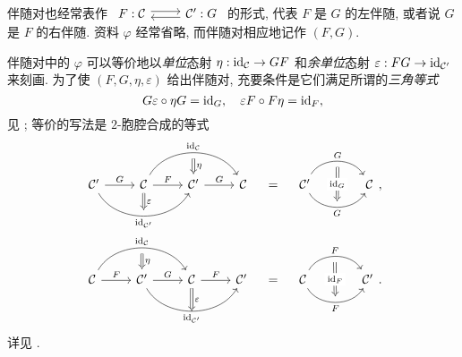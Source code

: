 伴随对也经常表作
$\begin{tikzcd}
	F: \mathcal{C} \arrow[shift left, r] & \mathcal{C}' \arrow[l, shift left] : G
\end{tikzcd}$
的形式, 代表 $F$ 是 $G$ 的左伴随, 或者说 $G$ 是 $F$ 的右伴随. 资料 $\varphi$ 经常省略, 而伴随对相应地记作 $(F, G)$.

伴随对中的 $\varphi$ 可以等价地以\emph{单位}态射 $\eta: \mathrm{id}_{\mathcal{C}} \to GF$ 和\emph{余单位}态射 $\varepsilon: FG \to \mathrm{id}_{\mathcal{C}'}$ 来刻画. 为了使 $(F, G, \eta, \varepsilon)$ 给出伴随对, 充要条件是它们满足所谓的\emph{三角等式}
\[ G\varepsilon \circ \eta G = \mathrm{id}_G, \quad \varepsilon F \circ F\eta = \mathrm{id}_F, \]
见 \cite[(2.6) + 命题 2.6.5]{Li1}; 等价的写法是 $2$-胞腔合成的等式
\begin{equation*}\begin{gathered}
	\begin{tikzcd}
		\mathcal{C}' \arrow[r, "G"] \arrow[rr, bend right=60, "\identity_{\mathcal{C}'}"', "" {name=B}] & \mathcal{C} \arrow[r, "F"] \arrow[Rightarrow, to=B, "\varepsilon"] \arrow[rr, bend left=60, "\identity_{\mathcal{C}}", ""' {name=T}] & \mathcal{C}' \arrow[r, "G"] \arrow[Rightarrow, from=T, "\eta"] & \mathcal{C}
	\end{tikzcd} \quad = \quad \begin{tikzcd}[column sep=large]
		\mathcal{C}' \arrow[r, bend left=60, "G", ""' {name=T}] \arrow[r, bend right=60, "G"', "" {name=B}] & \mathcal{C} \arrow[Rightarrow, from=T, to=B, "{\identity_G}" description]
	\end{tikzcd} , \\
	\begin{tikzcd}
		\mathcal{C} \arrow[r, "F"] \arrow[rr, bend left=60, "\identity_{\mathcal{C}}", ""' {name=T}] & \mathcal{C}' \arrow[r, "G"] \arrow[Rightarrow, from=T, "\eta"] \arrow[rr, bend right=60, "\identity_{\mathcal{C}'}"', ""' {name=B}] & \mathcal{C} \arrow[r, "F"] \arrow[Rightarrow, to=B, "\varepsilon"] & \mathcal{C}'
	\end{tikzcd} \quad = \quad \begin{tikzcd}[column sep=large]
		\mathcal{C} \arrow[r, bend left=60, "F", ""' {name=T}] \arrow[r, bend right=60, "F"', "" {name=B}] & \mathcal{C}' \arrow[Rightarrow, from=T, to=B, "{\identity_F}" description]
	\end{tikzcd}.
\end{gathered}\end{equation*}
详见 \cite[注记 2.6.6]{Li1}.

